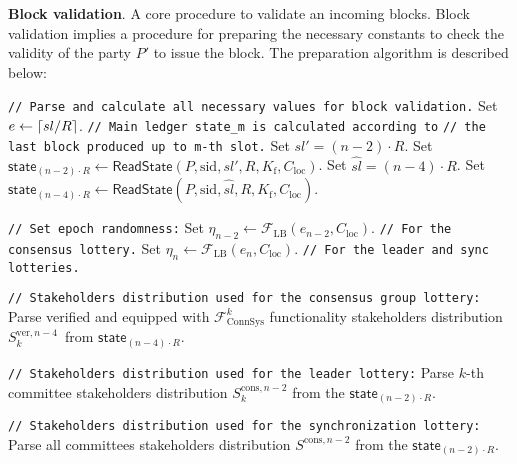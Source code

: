 \textbf{Block validation}.\label{apndx:prepare-block-validation}
A core procedure to validate an incoming blocks.
Block validation implies a procedure for preparing the necessary constants to check the validity of the party $P'$ to issue the block.
The preparation algorithm is described below:
\begin{protocol}
    \caption{$\textsf{PrepareForBlockValidation}(P, \text{sid}, sl, R, l_{\text{VRF}}, K_{\text{f}}, C_{\text{loc}},
    v_{P'}^{\text{vrf}}, S_k^{\text{id}}, f^{\text{lead}}_k, f^{\text{cons}}_k)$}
    \begin{algorithmic}[1]
        \noindent
        \lstinline|// Parse and calculate all necessary values for block validation.|
        \State Set $e \leftarrow \lceil sl/\\R \rceil$.
        \noindent
        \lstinline|// Main ledger state_m is calculated according to|
        \noindent
        \lstinline|// the last block produced up to m-th slot.|
        \State Set $ sl' = (n - 2)\cdot R$.
        \State Set $\textsf{state}_{(n - 2)\cdot R} \leftarrow \textsf{ReadState}(P, \text{sid}, sl', R, K_{\text{f}}, C_{\text{loc}})$.
        \State Set $ \hat{sl} = (n - 4)\cdot R$.
        \State Set $\textsf{state}_{(n - 4)\cdot R} \leftarrow \textsf{ReadState}(P, \text{sid}, \hat{sl}, R, K_{\text{f}}, C_{\text{loc}})$.

        \noindent
        \lstinline|// Set epoch randomness:|
        \State Set ${\eta_{n-2} \leftarrow \mathcal{F}_{\text{LB}}(e_{n-2}, C_{\text{loc}})}$. \lstinline|// For the consensus lottery.|
        \State Set ${\eta_{n} \leftarrow \mathcal{F}_{\text{LB}}(e_{n}, C_{\text{loc}})}$. \lstinline|// For the leader and sync lotteries.|

        \noindent
        \lstinline|// Stakeholders distribution used for the consensus group lottery:|
        \State Parse verified and equipped with $\mathcal{F}^k_{\text{ConnSys}}$ functionality stakeholders distribution $S_k^{\text{ver}, {n - 4}}$\
        from $\textsf{state}_{(n - 4)\cdot R}$.

        \noindent
        \lstinline|// Stakeholders distribution used for the leader lottery:|
        \State Parse $k$-th committee stakeholders distribution $S_k^{\text{cons}, n - 2}$ from the $\textsf{state}_{(n - 2)\cdot R}$.

        \noindent
        \lstinline|// Stakeholders distribution used for the synchronization lottery:|
        \State Parse all committees stakeholders distribution $S^{\text{cons}, n - 2}$ from the $\textsf{state}_{(n - 2)\cdot R}$.


\end{algorithmic}
\end{protocol}
